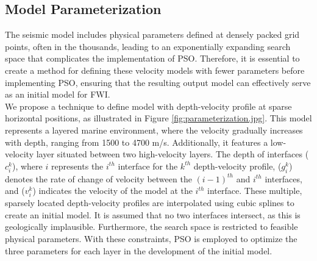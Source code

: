 \documentclass[paper,revised]{geophysics}
\begin{document}

\subsection{Model Parameterization}
The seismic model includes physical parameters defined at densely packed grid points, often in the thousands, leading to an exponentially expanding search space that complicates the implementation of PSO. Therefore, it is essential to create a method for defining these velocity models with fewer parameters before implementing PSO, ensuring that the resulting output model can effectively serve as an initial model for FWI. 
\\
We propose a technique to define model with depth-velocity profile at sparse horizontal positions, as illustrated in Figure \ref{fig:parameterization.jpg}. This model represents a layered marine environment, where the velocity gradually increases with depth, ranging from 1500 to 4700 m/s. Additionally, it features a low-velocity layer situated between two high-velocity layers. The depth of interfaces (\(c_i^k\)), where \(i\) represents the \(i^{th}\) interface for the \(k^{th}\) depth-velocity profile, (\(g_i^k\)) denotes the rate of change of velocity between the \((i - 1)^{th}\) and \(i^{th}\) interfaces, and (\(v_i^k\)) indicates the velocity of the model at the \(i^{th}\) interface.  These multiple, sparsely located depth-velocity profiles are interpolated using cubic splines to create an initial model. It is assumed that no two interfaces intersect, as this is geologically implausible. Furthermore, the search space is restricted to feasible physical parameters. With these constraints, PSO is employed to optimize the three parameters for each layer in the development of the initial model.

\end{document}
